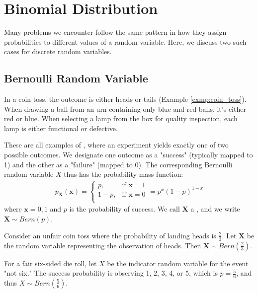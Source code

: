 \section{Binomial Distribution}

Many problems we encounter follow the same pattern in how they assign probabilities to different values of a random variable.
Here, we discuss two such cases for discrete random variables.

\subsection{Bernoulli Random Variable}

In a coin toss, the outcome is either heads or tails (Example \autoref{exmp:coin_toss}).
When drawing a ball from an urn containing only blue and red balls, it's either red or blue.
When selecting a lamp from the box for quality inspection, each lamp is either functional or defective.

These are all examples of , where an experiment yields exactly one of two possible outcomes.
We designate one outcome as a "success" (typically mapped to 1) and the other as a "failure" (mapped to 0).
The corresponding Bernoulli random variable \( X \) thus has the probability mass function:
\begin{gather*}
    p_{\bm{X}}(\bm{x}) = \begin{cases}
        p, & \text{if } \bm{x} = 1\\
        1 - p, & \text{if } \bm{x} = 0\\
    \end{cases}
    = p^x(1 - p)^{1 - x}
\end{gather*}
where \( \bm{x} = 0, 1 \) and \( p \) is the probability of success.
We call \( \bm{X} \) a , and we write \( \bm{X} \sim Bern(p) \).
\begin{exmp}
    Consider an unfair coin toss where the probability of landing heads is \( \frac{2}{3} \).
    Let \( \bm{X} \) be the random variable representing the observation of heads. Then \( \bm{X} \sim Bern(\frac{2}{3}) \).
\end{exmp}
\begin{exmp}
    For a fair six-sided die roll, let \( X \) be the indicator random variable for the event "not six."
    The success probability is observing 1, 2, 3, 4, or 5,
    which is \( p = \frac{5}{6} \),
    and thus \( X \sim Bern(\frac{5}{6}) \).
\end{exmp}